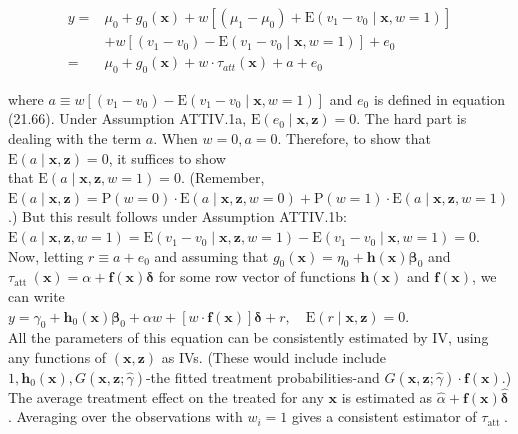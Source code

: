 \documentclass[10pt]{article}
\begin{document}
\begin{align*}
y= & \mu_{0}+g_{0}(\mathbf{x})+w\left[\left(\mu_{1}-\mu_{0}\right)+\mathrm{E}\left(v_{1}-v_{0} \mid \mathbf{x}, w=1\right)\right] \\
& +w\left[\left(v_{1}-v_{0}\right)-\mathrm{E}\left(v_{1}-v_{0} \mid \mathbf{x}, w=1\right)\right]+e_{0} \\
= & \mu_{0}+g_{0}(\mathbf{x})+w \cdot \tau_{a t t}(\mathbf{x})+a+e_{0} \tag{21.86}
\end{align*}


where $a \equiv w\left[\left(v_{1}-v_{0}\right)-\mathrm{E}\left(v_{1}-v_{0} \mid \mathbf{x}, w=1\right)\right]$ and $e_{0}$ is defined in equation (21.66). Under Assumption ATTIV.1a, $\mathrm{E}\left(e_{0} \mid \mathbf{x}, \mathbf{z}\right)=0$. The hard part is dealing with the term $a$. When $w=0, a=0$. Therefore, to show that $\mathrm{E}(a \mid \mathbf{x}, \mathbf{z})=0$, it suffices to show\\
that $\mathrm{E}(a \mid \mathbf{x}, \mathbf{z}, w=1)=0$. (Remember, $\mathrm{E}(a \mid \mathbf{x}, \mathbf{z})=\mathrm{P}(w=0) \cdot \mathrm{E}(a \mid \mathbf{x}, \mathbf{z}, w=0)+ \mathrm{P}(w=1) \cdot \mathrm{E}(a \mid \mathbf{x}, \mathbf{z}, w=1)$.) But this result follows under Assumption ATTIV.1b:\\
$\mathrm{E}(a \mid \mathbf{x}, \mathbf{z}, w=1)=\mathrm{E}\left(v_{1}-v_{0} \mid \mathbf{x}, \mathbf{z}, w=1\right)-\mathrm{E}\left(v_{1}-v_{0} \mid \mathbf{x}, w=1\right)=0$.\\
Now, letting $r \equiv a+e_{0}$ and assuming that $g_{0}(\mathbf{x})=\eta_{0}+\mathbf{h}(\mathbf{x}) \boldsymbol{\beta}_{0}$ and $\tau_{\text {att }}(\mathbf{x})=\alpha+ \mathbf{f}(\mathbf{x}) \boldsymbol{\delta}$ for some row vector of functions $\mathbf{h}(\mathbf{x})$ and $\mathbf{f}(\mathbf{x})$, we can write\\
$y=\gamma_{0}+\mathbf{h}_{0}(\mathbf{x}) \boldsymbol{\beta}_{0}+\alpha w+[w \cdot \mathbf{f}(\mathbf{x})] \boldsymbol{\delta}+r, \quad \mathrm{E}(r \mid \mathbf{x}, \mathbf{z})=0$.\\
All the parameters of this equation can be consistently estimated by IV, using any functions of $(\mathbf{x}, \mathbf{z})$ as IVs. (These would include include $1, \mathbf{h}_{0}(\mathbf{x}), G(\mathbf{x}, \mathbf{z} ; \hat{\gamma})$-the fitted treatment probabilities-and $G(\mathbf{x}, \mathbf{z} ; \hat{\gamma}) \cdot \mathbf{f}(\mathbf{x})$.) The average treatment effect on the treated for any $\mathbf{x}$ is estimated as $\hat{\alpha}+\mathbf{f}(\mathbf{x}) \hat{\boldsymbol{\delta}}$. Averaging over the observations with $w_{i}=1$ gives a consistent estimator of $\tau_{\text {att }}$.
\end{document}
